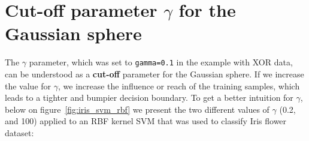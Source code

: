\documentclass[11pt]{article}
\begin{document}
    \section{Cut-off parameter $\gamma$ for the Gaussian sphere} \label{sec:gamma}

    The $\gamma$ parameter, which was set to \texttt{gamma=0.1} in the example with XOR data, can be understood as a \textbf{cut-off} parameter for the Gaussian sphere.
    If we increase the value for $\gamma$, we increase the influence or reach of the training samples, which leads to a tighter and bumpier decision boundary.
    To get a better intuition for $\gamma$, below on figure~\ref{fig:iris_svm_rbf} we present the two different values of $\gamma$ (0.2, and 100) applied to an RBF kernel SVM that was used to classify Iris flower dataset:
\end{document}
